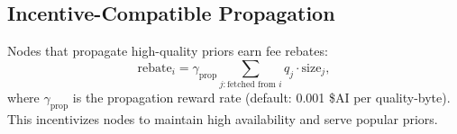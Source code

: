 \subsection{Incentive-Compatible Propagation}

Nodes that propagate high-quality priors earn fee rebates:
\begin{equation}
    \text{rebate}_i = \gamma_{\text{prop}} \sum_{j: \text{fetched from } i} q_j \cdot \text{size}_j,
    \label{eq:rebate}
\end{equation}
where $\gamma_{\text{prop}}$ is the propagation reward rate (default: 0.001 \$AI
per quality-byte). This incentivizes nodes to maintain high availability and
serve popular priors.

